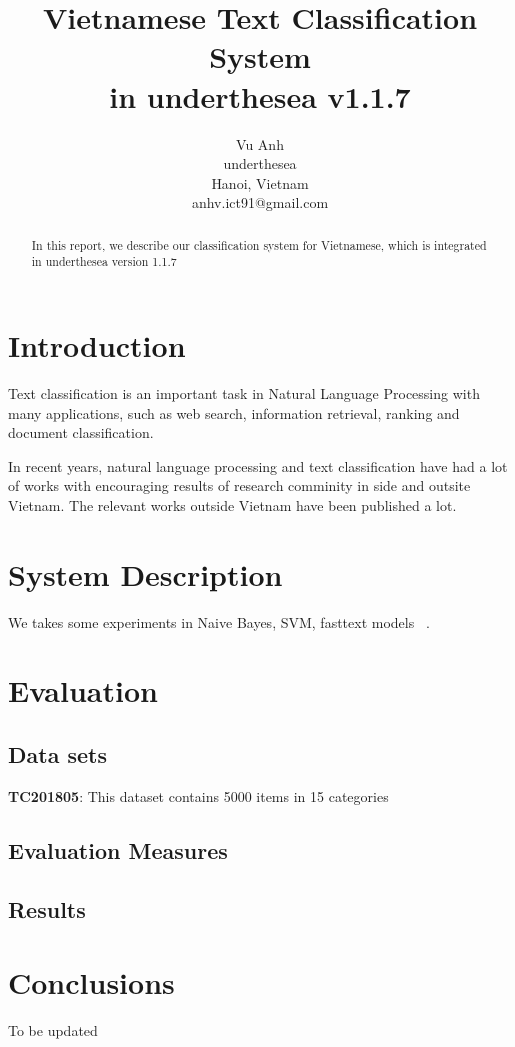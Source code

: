 \documentclass[11pt,a4paper]{article}
\title{Vietnamese Text Classification System \\ in underthesea v1.1.7}
\author{
Vu Anh\\
underthesea\\
Hanoi, Vietnam\\
anhv.ict91@gmail.com
}
\date{}
\begin{document}
\maketitle
\begin{abstract}
In this report, we describe our classification system for Vietnamese, which is integrated in underthesea version 1.1.7

\end{abstract}

\section{Introduction}

Text classification is an important task in Natural Language Processing with many applications, such as web search, information retrieval, ranking and document classification.

In recent years, natural language processing and text classification have had a lot of works with encouraging results of research comminity in side and outsite Vietnam. The relevant works outside Vietnam have been published a lot.

\section{System Description}

We takes some experiments in Naive Bayes, SVM, fasttext models ~\cite{DBLP:journals/corr/JoulinGBM16}.

\section{Evaluation}

\subsection{Data sets}

\noindent \textbf{TC201805}: This dataset contains 5000 items in 15 categories

\subsection{Evaluation Measures}

\subsection{Results}


\section{Conclusions}

To be updated



\end{document}
